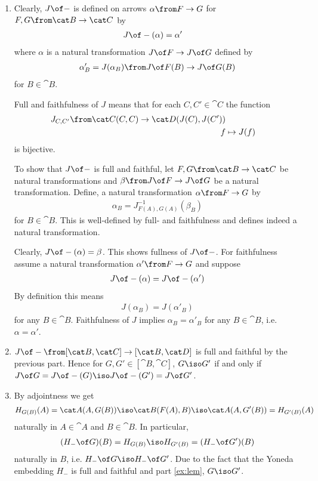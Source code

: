 \begin{answer}
  \begin{enumerate}
  \item Clearly, $J\of-$ is defined on arrows $\alpha\from F\to G$ for $F,G\from\cat B\to\cat C$ by
    \begin{align*}
      J\of -(\alpha)&=\alpha'
    \end{align*} 
    where $\alpha$ is a natural transformation $J\of F\to J\of G$ defined by
    \begin{align*}
      \alpha'_B=J(\alpha_B)\from J\of F(B)\to J\of G(B)
    \end{align*}
    for $B\in\cat B$.

    Full and faithfulness of $J$ means that for each $C,C'\in\cat C$ the function
    \begin{align*}
      J_{C,C'}\from\cat C(C,C)\to \cat D(J(C),J(C'))\\
      f&\mapsto J(f)
    \end{align*}
    is bijective.

    To show that $J\of-$ is full and faithful, let $F,G\from\cat B\to\cat C$ be natural transformations and $\beta\from J\of F\to J\of G$ be a natural transformation.
    Define, a natural transformation $\alpha\from F\to G$ by 
    \begin{align*}
      \alpha_B=J_{F(A),G(A)}^{-1}(\beta_B)
    \end{align*}
    for $B\in\cat B$. This is well-defined by full- and faithfulness and defines indeed a natural transformation.

    Clearly, $J\of -(\alpha)=\beta$. This shows fullness of $J\of -$. For faithfulness assume a natural transformation $\alpha'\from F\to G$ and suppose 
    \begin{align*}
      J\of-(\alpha)=J\of-(\alpha')
    \end{align*}
    By definition this means
    \begin{align*}
      J(\alpha_B)=J(\alpha'_B)
    \end{align*}
    for any $B\in\cat B$. Faithfulness of $J$ implies $\alpha_B=\alpha'_B$ for any $B\in\cat B$, i.e. $\alpha=\alpha'$.
  \item \label{ex:lem} $J\of -\from[\cat B,\cat C]\to [\cat B,\cat D]$ is full and faithful by the previous part. Hence for $G,G'\in [\cat B,\cat C]$, $G\iso G'$ if and only if $J\of G=J\of-(G)\iso J\of-(G')=J\of G'$.
  \item By adjointness we get
    \begin{align*}
      H_{G(B)}(A)=\cat A(A,G(B))\iso\cat B(F(A),B)\iso\cat A(A,G'(B))=H_{G'(B)}(A)
    \end{align*}
    naturally in $A\in\cat A$ and $B\in\cat B$. In particular,
    \begin{align*}
      (H_-\of G)(B)=H_{G(B)}\iso H_{G'(B)}=(H_-\of G')(B)
    \end{align*}
    naturally in $B$, i.e. $H_-\of G\iso H_-\of G'$. Due to the fact that the Yoneda embedding $H_-$ is full and faithful and part \ref{ex:lem}, $G\iso G'$.


\end{enumerate}
\end{answer}
